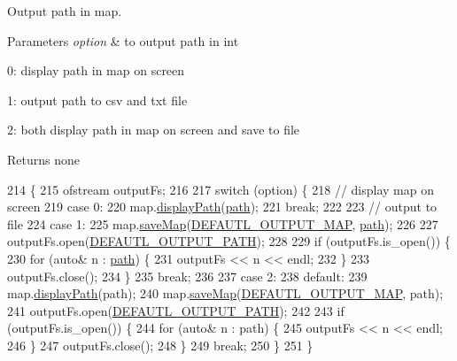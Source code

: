 Output path in map. 


\begin{DoxyParams}{Parameters}
{\em option} & to output path in int \par
 0\-: display path in map on screen \par
 1\-: output path to csv and txt file\par
 2\-: both display path in map on screen and save to file \\
\hline
\end{DoxyParams}
\begin{DoxyReturn}{Returns}
none 
\end{DoxyReturn}

\begin{DoxyCode}
214                                                 \{
215     ofstream outputFs;
216 
217     \textcolor{keywordflow}{switch} (option) \{
218          \textcolor{comment}{// display map on screen}
219         \textcolor{keywordflow}{case} 0:
220             map.\hyperlink{classMap_a4358aea9eb9f207aae23fc8d9a40b97a}{displayPath}(\hyperlink{classPathFindingAlgorithm_ab177b2276cdf28fb77361bff19745b17}{path});
221             \textcolor{keywordflow}{break};
222 
223         \textcolor{comment}{// output to file}
224         \textcolor{keywordflow}{case} 1:
225             map.\hyperlink{classMap_a43ce2c046c7908d95e06bd29182ac6bf}{saveMap}(\hyperlink{PathFindAlgorithm_8hpp_aaac5b5627661fef63e64ce61808f30f8}{DEFAUTL\_OUTPUT\_MAP}, \hyperlink{classPathFindingAlgorithm_ab177b2276cdf28fb77361bff19745b17}{path});
226 
227             outputFs.open(\hyperlink{PathFindAlgorithm_8hpp_a2fa4f0a512b2d876f34e9aec1765d791}{DEFAUTL\_OUTPUT\_PATH});
228 
229             \textcolor{keywordflow}{if} (outputFs.is\_open()) \{
230                 \textcolor{keywordflow}{for} (\textcolor{keyword}{auto}& n : \hyperlink{classPathFindingAlgorithm_ab177b2276cdf28fb77361bff19745b17}{path}) \{
231                     outputFs << n << endl;
232                 \}
233                 outputFs.close();
234             \}
235             \textcolor{keywordflow}{break};
236 
237         \textcolor{keywordflow}{case} 2:
238         \textcolor{keywordflow}{default}:
239             map.\hyperlink{classMap_a4358aea9eb9f207aae23fc8d9a40b97a}{displayPath}(path);
240             map.\hyperlink{classMap_a43ce2c046c7908d95e06bd29182ac6bf}{saveMap}(\hyperlink{PathFindAlgorithm_8hpp_aaac5b5627661fef63e64ce61808f30f8}{DEFAUTL\_OUTPUT\_MAP}, path);
241             outputFs.open(\hyperlink{PathFindAlgorithm_8hpp_a2fa4f0a512b2d876f34e9aec1765d791}{DEFAUTL\_OUTPUT\_PATH});
242 
243             \textcolor{keywordflow}{if} (outputFs.is\_open()) \{
244                 \textcolor{keywordflow}{for} (\textcolor{keyword}{auto}& n : path) \{
245                     outputFs << n << endl;
246                 \}
247                 outputFs.close();
248             \}
249             \textcolor{keywordflow}{break};
250     \}
251 \}
\end{DoxyCode}

